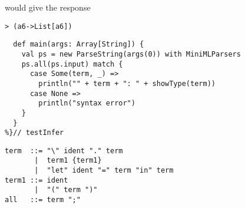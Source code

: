 would give the response
\begin{lstlisting}
> (a6->List[a6])
\end{lstlisting}
\begin{lstlisting}
  def main(args: Array[String]) {
    val ps = new ParseString(args(0)) with MiniMLParsers
    ps.all(ps.input) match {
      case Some(term, _) =>
        println("" + term + ": " + showType(term))
      case None =>
        println("syntax error")
    }
  }
%}// testInfer
\end{lstlisting}
\begin{lstlisting}
term  ::= "\" ident "." term
       |  term1 {term1}
       |  "let" ident "=" term "in" term
term1 ::= ident
       |  "(" term ")"
all   ::= term ";"
\end{lstlisting}
